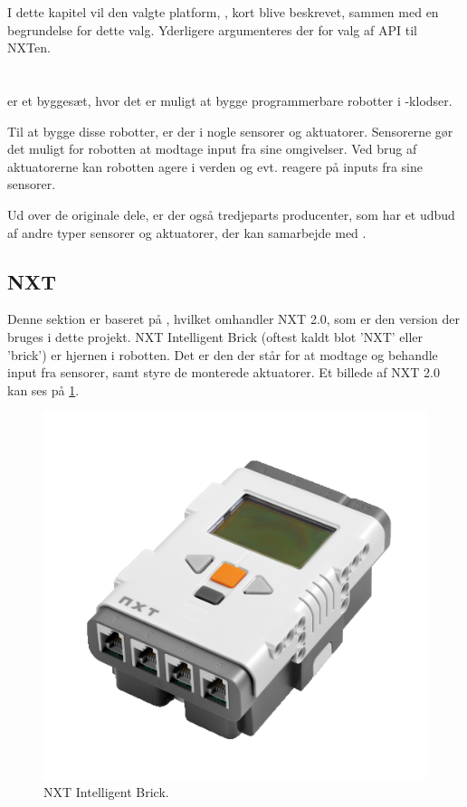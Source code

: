 I dette kapitel vil den valgte platform, \legoms, kort blive beskrevet, sammen med en begrundelse for dette valg.
Yderligere argumenteres der for valg af API til NXTen.

\section{\legoms}\label{lego:mindstorms-nxt}
\legoms er et byggesæt, hvor det er muligt at bygge programmerbare robotter i \lego-klodser.

Til at bygge disse robotter, er der i \legoms nogle sensorer og aktuatorer. Sensorerne gør det muligt for robotten at modtage input fra sine omgivelser.
Ved brug af aktuatorerne kan robotten agere i verden og evt. reagere på inputs fra sine sensorer.

Ud over de originale \lego dele, er der også tredjeparts producenter, som har et udbud af andre typer sensorer og aktuatorer, der kan samarbejde med \legoms.

\subsection{NXT}
Denne sektion er baseret på \cite{nxt}, hvilket omhandler NXT 2.0, som er den version der bruges i dette projekt.
NXT Intelligent Brick (oftest kaldt blot 'NXT' eller 'brick') er hjernen i \legoms robotten.
Det er den der står for at modtage og behandle input fra sensorer, samt styre de monterede aktuatorer.
Et billede af NXT 2.0 kan ses på \cref{platform:nxt}.

\begin{figure}
\begin{center}
\includegraphics[scale=.5]{./graphics/nxt/brick}
\end{center}
\caption{NXT Intelligent Brick.}
\label{platform:nxt}
\end{figure}

